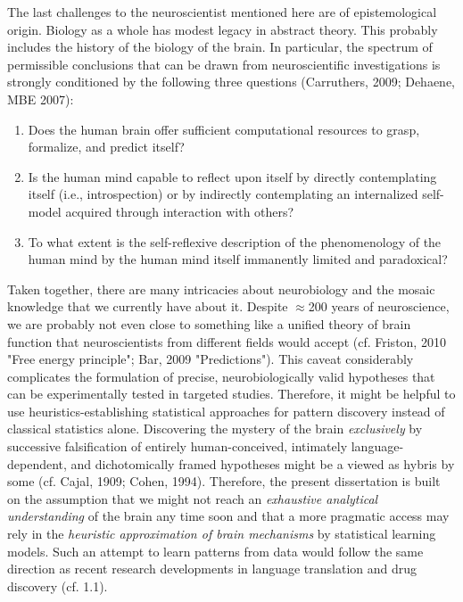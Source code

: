 \documentclass[authoryear,review,3p]{elsarticle}
\begin{document}
The last challenges to the neuroscientist
mentioned here are of epistemological origin.
Biology as a whole has modest legacy in abstract theory.
This probably includes the history of the biology of the brain.
In particular,
the spectrum of permissible conclusions
that can be drawn from neuroscientific investigations is strongly conditioned
by the following three questions
(Carruthers, 2009; Dehaene, MBE 2007):
\begin{enumerate}
  \item Does the human brain offer sufficient computational resources
  to grasp, formalize, and predict itself?
  \item Is the human mind capable to reflect upon itself
by directly contemplating itself (i.e., introspection) or by
indirectly contemplating an internalized self-model acquired through
interaction with others?
  \item To what extent is the self-reflexive description of the phenomenology of
  the human mind by the human mind itself immanently
  limited and paradoxical?
\end{enumerate}


Taken together,
there are many intricacies about neurobiology and 
the mosaic knowledge that we currently have about it.
%
Despite $\approx$200 years of neuroscience,
we are probably not even close to something like a unified theory of
brain function
that neuroscientists from different fields would accept
(cf. Friston, 2010 "Free energy principle"; Bar, 2009 "Predictions").
This caveat considerably complicates
the formulation of precise, neurobiologically
valid hypotheses that can be experimentally tested in targeted studies.
%
Therefore, it might be helpful to use heuristics-establishing
statistical approaches for pattern discovery instead of
classical statistics alone.
%
Discovering the mystery of the brain \textit{exclusively} by
successive falsification of
entirely human-conceived,
intimately language-dependent,
and dichotomically framed hypotheses
might be a viewed as hybris by some
(cf. Cajal, 1909; Cohen, 1994).
%
Therefore,
the present dissertation is built on the assumption that
we might not reach an \textit{exhaustive analytical understanding}
of the brain any time soon
and that a more pragmatic access
may rely in the \textit{heuristic
approximation of brain mechanisms} by statistical learning models.
%
Such an attempt to learn patterns from data
would follow the same
direction as recent research developments in
language translation and drug discovery (cf. 1.1).
\end{document}
